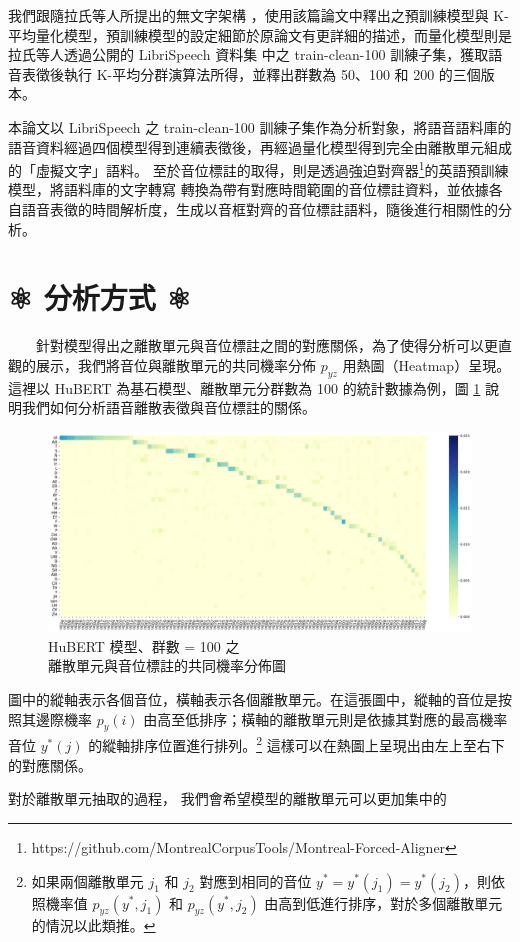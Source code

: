 {        我們跟隨拉氏等人所提出的無文字架構 \cite{lakhotia_generative_2021-1} ，使用該篇論文中釋出之預訓練模型與 K-平均量化模型，預訓練模型的設定細節於原論文有更詳細的描述，而量化模型則是拉氏等人透過公開的 LibriSpeech 資料集 \cite{panayotov_librispeech_2015} 中之 train-clean-100 訓練子集，獲取語音表徵後執行 K-平均分群演算法所得，並釋出群數為 50、100 和 200 的三個版本。

        本論文以 LibriSpeech 之 train-clean-100 訓練子集作為分析對象，將語音語料庫的語音資料經過四個模型得到連續表徵後，再經過量化模型得到完全由離散單元組成的「虛擬文字」語料。
        至於音位標註的取得，則是透過強迫對齊器\footnote{https://github.com/MontrealCorpusTools/Montreal-Forced-Aligner}的英語預訓練模型，將語料庫的文字轉寫
        轉換為帶有對應時間範圍的音位標註資料，並依據各自語音表徵的時間解析度，生成以音框對齊的音位標註語料，隨後進行相關性的分析。



}  %

\section{⚛️ 分析方式 ⚛️}

　　針對模型得出之離散單元與音位標註之間的對應關係，為了使得分析可以更直觀的展示，我們將音位與離散單元的共同機率分佈 \(p_{yz}\) 用熱圖（Heatmap）呈現。這裡以 HuBERT 為基石模型、離散單元分群數為 100 的統計數據為例，圖 \ref{fig:joint-byprob-hub100} 說明我們如何分析語音離散表徵與音位標註的關係。
    {    
        \begin{figure}[ht]
            \centering
            \includegraphics[width=1\linewidth]{figures/joint_sortby_prphn-hub-100.png}
            \caption{HuBERT 模型、群數 = 100 之 \\ 
            離散單元與音位標註的共同機率分佈圖}
            \label{fig:joint-byprob-hub100}
        \end{figure} 
    }
        圖中的縱軸表示各個音位，橫軸表示各個離散單元。在這張圖中，縱軸的音位是按照其邊際機率 \(p_y(i)\) 由高至低排序；橫軸的離散單元則是依據其對應的最高機率音位 \(y^\ast(j)\) 的縱軸排序位置進行排列。\footnote{如果兩個離散單元 \(j_1\) 和 \(j_2\) 對應到相同的音位 \(y^\ast = y^\ast(j_1) = y^\ast(j_2)\)，則依照機率值 \(p_{yz}(y^\ast, j_1)\) 和 \(p_{yz}(y^\ast, j_2)\) 由高到低進行排序，對於多個離散單元的情況以此類推。} 這樣可以在熱圖上呈現出由左上至右下的對應關係。

        對於離散單元抽取的過程，
我們會希望模型的離散單元可以更加集中的